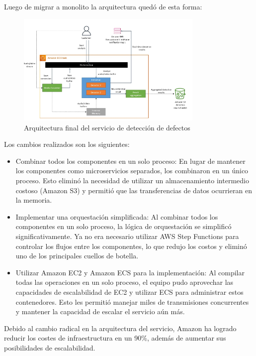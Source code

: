\documentclass[12pt,a4paper]{article}
\begin{document}
    Luego de migrar a monolito la arquitectura quedó de esta forma:
    
    \begin{figure}[H]
        \centering
        \includegraphics[width=0.8\textwidth]{./img/final_deteccion_fallos_amazon.png}
        \caption{Arquitectura final del servicio de detección de defectos}
        \label{fig:amazon_deteccion_fallos_fin}
    \end{figure}

    Los cambios realizados son los siguientes:

    \begin{itemize}
        \item Combinar todos los componentes en un solo proceso: En lugar de mantener los componentes como microservicios separados, los combinaron en un único proceso. Esto eliminó la necesidad de utilizar un almacenamiento intermedio costoso (Amazon S3) y permitió que las transferencias de datos ocurrieran en la memoria.
        \item Implementar una orquestación simplificada: Al combinar todos los componentes en un solo proceso, la lógica de orquestación se simplificó significativamente. Ya no era necesario utilizar AWS Step Functions para controlar los flujos entre los componentes, lo que redujo los costos y eliminó uno de los principales cuellos de botella.
        \item Utilizar Amazon EC2 y Amazon ECS para la implementación: Al compilar todas las operaciones en un solo proceso, el equipo pudo aprovechar las capacidades de escalabilidad de EC2 y utilizar ECS para administrar estos contenedores. Esto les permitió manejar miles de transmisiones concurrentes y mantener la capacidad de escalar el servicio aún más.
    \end{itemize}

    Debido al cambio radical en la arquitectura del servicio, Amazon ha logrado reducir los costes de infraestructura en un 90\%, además de aumentar sus posibilidades de escalabilidad.
\end{document}
